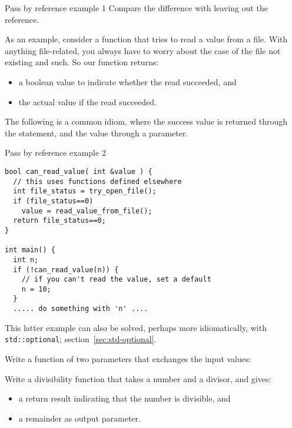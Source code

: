 \begin{block}{Pass by reference example 1}
  \label{sl:pass-reference1}
  Compare the difference with leaving out the reference.
\end{block}

As an example, consider a function that tries to read a value from a
file. With anything file-related, you always have to worry about the
case of the file not existing and such. So our function returns:
\begin{itemize}
\item a boolean value to indicate whether the read succeeded, and
\item the actual value if the read succeeded.
\end{itemize}
The following is a common idiom, where the success value is returned
through the  statement, and the value through a parameter.

\begin{block}{Pass by reference example 2}
  \label{sl:pass-reference2}
\footnotesize
\begin{lstlisting}
bool can_read_value( int &value ) {
  // this uses functions defined elsewhere
  int file_status = try_open_file();
  if (file_status==0) 
    value = read_value_from_file();
  return file_status==0;
}

int main() {
  int n;
  if (!can_read_value(n)) {
    // if you can't read the value, set a default
    n = 10;
  }
  ..... do something with 'n' ....
\end{lstlisting}
\end{block}

This latter example can also be solved,
perhaps more idiomatically, with \lstinline+std::optional+;
section~\ref{sec:std-optional}.

\begin{exercise}
  \label{ex:swap}
  Write a  function  of two parameters that
  exchanges the input values:
\end{exercise}

\begin{exercise}
  \label{ex:div-remain}
  Write a divisibility function that takes a number and a divisor, and gives:
  \begin{itemize}
  \item a  return result indicating that the number is
    divisible, and
  \item a remainder as output parameter.
  \end{itemize}
\end{exercise}

